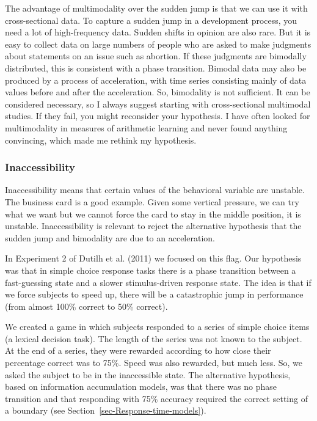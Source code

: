 \documentclass[
  a4paper,
  DIV=11,
  numbers=noendperiod]{scrreprt}
\begin{document}
The advantage of multimodality over the sudden jump is that we can use
it with cross-sectional data. To capture a sudden jump in a development
process, you need a lot of high-frequency data. Sudden shifts in opinion
are also rare. But it is easy to collect data on large numbers of people
who are asked to make judgments about statements on an issue such as
abortion. If these judgments are bimodally distributed, this is
consistent with a phase transition. Bimodal data may also be produced by
a process of acceleration, with time series consisting mainly of data
values before and after the acceleration. So, bimodality is not
sufficient. It can be considered necessary, so I always suggest starting
with cross-sectional multimodal studies. If they fail, you might
reconsider your hypothesis. I have often looked for multimodality in
measures of arithmetic learning and never found anything convincing,
which made me rethink my hypothesis.

\hypertarget{sec-Inaccessibility}{%
\subsubsection{Inaccessibility}\label{sec-Inaccessibility}}

Inaccessibility means that certain values of the behavioral variable are
unstable. The business card is a good example. Given some vertical
pressure, we can try what we want but we cannot force the card to stay
in the middle position, it is unstable. Inaccessibility is relevant to
reject the alternative hypothesis that the sudden jump and bimodality
are due to an acceleration.

In Experiment 2 of Dutilh et al. (2011) we focused on this flag. Our
hypothesis was that in simple choice response tasks there is a phase
transition between a fast-guessing state and a slower stimulus-driven
response state. The idea is that if we force subjects to speed up, there
will be a catastrophic jump in performance (from almost 100\% correct to
50\% correct).

We created a game in which subjects responded to a series of simple
choice items (a lexical decision task). The length of the series was not
known to the subject. At the end of a series, they were rewarded
according to how close their percentage correct was to 75\%. Speed was
also rewarded, but much less. So, we asked the subject to be in the
inaccessible state. The alternative hypothesis, based on information
accumulation models, was that there was no phase transition and that
responding with 75\% accuracy required the correct setting of a boundary
(see Section~\ref{sec-Response-time-models}).
\end{document}
